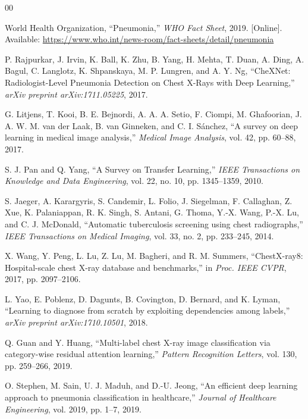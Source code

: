 \documentclass[conference]{IEEEtran}
\begin{document}
\begin{thebibliography}{00}

World Health Organization, ``Pneumonia,''
\textit{WHO Fact Sheet}, 2019. [Online]. Available:
\url{https://www.who.int/news-room/fact-sheets/detail/pneumonia}

P. Rajpurkar, J. Irvin, K. Ball, K. Zhu, B. Yang, H. Mehta,
T. Duan, A. Ding, A. Bagul, C. Langlotz, K. Shpanskaya,
M. P. Lungren, and A. Y. Ng,
``CheXNet: Radiologist-Level Pneumonia Detection on Chest
X-Rays with Deep Learning,''
\textit{arXiv preprint arXiv:1711.05225}, 2017.

G. Litjens, T. Kooi, B. E. Bejnordi, A. A. A. Setio,
F. Ciompi, M. Ghafoorian, J. A. W. M. van der Laak,
B. van Ginneken, and C. I. Sánchez,
``A survey on deep learning in medical image analysis,''
\textit{Medical Image Analysis}, vol. 42, pp. 60--88, 2017.

S. J. Pan and Q. Yang,
``A Survey on Transfer Learning,''
\textit{IEEE Transactions on Knowledge and Data Engineering},
vol. 22, no. 10, pp. 1345--1359, 2010.

S. Jaeger, A. Karargyris, S. Candemir, L. Folio,
J. Siegelman, F. Callaghan, Z. Xue, K. Palaniappan,
R. K. Singh, S. Antani, G. Thoma, Y.-X. Wang, P.-X. Lu,
and C. J. McDonald,
``Automatic tuberculosis screening using chest radiographs,''
\textit{IEEE Transactions on Medical Imaging},
vol. 33, no. 2, pp. 233--245, 2014.

X. Wang, Y. Peng, L. Lu, Z. Lu, M. Bagheri, and
R. M. Summers,
``ChestX-ray8: Hospital-scale chest X-ray database and
benchmarks,''
in \textit{Proc. IEEE CVPR}, 2017, pp. 2097--2106.

L. Yao, E. Poblenz, D. Dagunts, B. Covington, D. Bernard,
and K. Lyman,
``Learning to diagnose from scratch by exploiting dependencies
among labels,''
\textit{arXiv preprint arXiv:1710.10501}, 2018.

Q. Guan and Y. Huang,
``Multi-label chest X-ray image classification via
category-wise residual attention learning,''
\textit{Pattern Recognition Letters},
vol. 130, pp. 259--266, 2019.

O. Stephen, M. Sain, U. J. Maduh, and D.-U. Jeong,
``An efficient deep learning approach to pneumonia
classification in healthcare,''
\textit{Journal of Healthcare Engineering},
vol. 2019, pp. 1--7, 2019.


\end{thebibliography}
\end{document}
